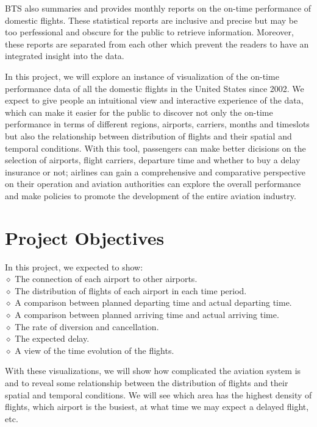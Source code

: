 \documentclass[12pt]{article}
\begin{document}
BTS also summaries and provides monthly reports on the on-time performance of domestic flights. These statistical reports are inclusive and precise but may be too perfessional and obscure for the public to retrieve information. Moreover, these reports are separated from each other which prevent the readers to have an integrated insight into the data.

In this project, we will explore an instance of visualization of the on-time performance data of all the domestic flights in the United States since 2002. We expect to give people an intuitional view and interactive experience of the data, which can make it easier for the public to discover not only the on-time performance in terms of different regions, airports, carriers, months and timeslots but also the relationship between distribution of flights and their spatial and temporal conditions. With this tool, passengers can make better dicisions on the selection of airports, flight carriers, departure time and whether to buy a delay insurance or not; airlines can gain a comprehensive and comparative perspective on their operation and aviation authorities can explore the overall performance and make policies to promote the development of the entire aviation industry.

\section{Project Objectives}
    \noindent In this project, we expected to show:\\
    $\diamond$ The connection of each airport to other airports.\\
    $\diamond$ The distribution of flights of each airport in each time period.\\
    $\diamond$ A comparison between planned departing time and actual departing time.\\
    $\diamond$ A comparison between planned arriving time and actual arriving time.\\
    $\diamond$ The rate of diversion and cancellation.\\
    $\diamond$ The expected delay.\\
    $\diamond$ A view of the time evolution of the flights.

    With these visualizations, we will show how complicated the aviation system is and to reveal some relationship between the distribution of flights and their spatial and temporal conditions. We will see which area has the highest density of flights, which airport is the busiest, at what time we may expect a delayed flight, etc.
\end{document}
